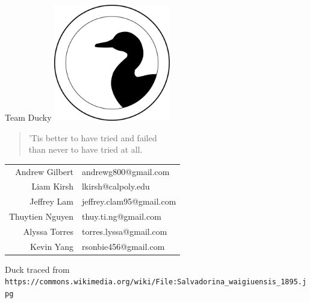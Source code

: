 \documentclass[titlepage,12 pt]{article}
\begin{document}
\begin{titlepage}
  \centering
  {\Huge Team Ducky}
  \vfill
  \includegraphics[width=2in]{duck}
  \vfill
  {    \large
    \begin{minipage}{\widthof{'Tis better to have tried and failed} + 1in}
      \begin{verse}
        'Tis better to have tried and failed\\
        than never to have tried at all.
      \end{verse}
    \end{minipage}
  }
  \vfill
  \begin{tabular}{rl}
    Andrew Gilbert & andrewg800@gmail.com\\
    Liam Kirsh & lkirsh@calpoly.edu\\
    Jeffrey Lam & jeffrey.clam95@gmail.com\\
    Thuytien Nguyen & thuy.ti.ng@gmail.com\\
    Alyssa Torres & torres.lyssa@gmail.com\\
    Kevin Yang & rsonbie456@gmail.com
  \end{tabular}
  \vfill
  {\footnotesize Duck traced from \verb|https://commons.wikimedia.org/wiki/File:Salvadorina_waigiuensis_1895.jpg|}
\end{titlepage}
% 
% 
% 
\end{document}
